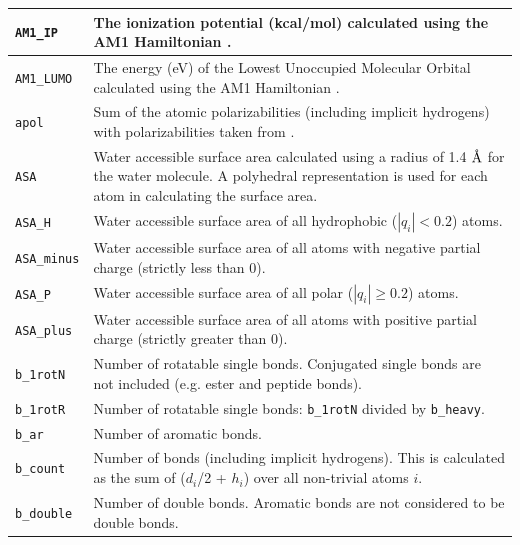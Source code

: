 \documentclass[12pt,a4paper]{article}
\newcommand{\angstrom}{\mbox{\normalfont\AA}}
\begin{document}
\begin{longtable}{@{\zz}|p{}|p{}|}
\texttt{AM1\_IP} & The ionization potential (kcal/mol) calculated using the AM1 
Hamiltonian \cite{MOPAC1993}.\\ \hline

\texttt{AM1\_LUMO} & The energy (eV) of the Lowest Unoccupied Molecular Orbital 
calculated using the AM1 Hamiltonian \cite{MOPAC1993}.\\ \hline

\texttt{apol} & Sum of the atomic polarizabilities (including implicit 
hydrogens) with polarizabilities taken from \cite{CRC1994}.\\ \hline

\texttt{ASA} & Water accessible surface area calculated using a radius of 1.4 
$\angstrom$ for the water molecule. A polyhedral representation is used for each 
atom in calculating the surface area.\\ \hline

\texttt{ASA\_H} & Water accessible surface area of all hydrophobic ($|q_i|<0.2$) 
atoms.\\ \hline

\texttt{ASA\_minus} & Water accessible surface area of all atoms with negative 
partial charge (strictly less than 0).\\ \hline

\texttt{ASA\_P} & Water accessible surface area of all polar ($|q_i|\geq0.2$) 
atoms.\\ \hline

\texttt{ASA\_plus} & Water accessible surface area of all atoms with positive 
partial charge (strictly greater than 0).\\ \hline

\texttt{b\_1rotN} & Number of rotatable single bonds. Conjugated single bonds 
are not included (e.g. ester and peptide bonds).\\ \hline

\texttt{b\_1rotR} & Number of rotatable single bonds: \texttt{b\_1rotN} divided 
by \texttt{b\_heavy}.\\ \hline

\texttt{b\_ar} & Number of aromatic bonds.\\ \hline

\texttt{b\_count} & Number of bonds (including implicit hydrogens). This is 
calculated as the sum of ($d_i$/2 + $h_i$) over all non-trivial atoms $i$.\\ 
\hline

\texttt{b\_double} & Number of double bonds. Aromatic bonds are not considered 
to be double bonds.\\ \hline


\end{longtable}
\end{document}
